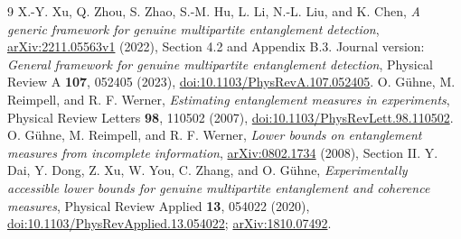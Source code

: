 \documentclass[11pt]{article}
\begin{document}
\begin{thebibliography}{9}
 X.-Y. Xu, Q. Zhou, S. Zhao, S.-M. Hu, L. Li, N.-L. Liu,
and K. Chen, \emph{A generic framework for genuine multipartite entanglement
detection}, \href{https://arxiv.org/abs/2211.05563v1}{arXiv:2211.05563v1}
(2022), Section 4.2 and Appendix B.3.
Journal version: \emph{General framework for genuine multipartite entanglement
detection}, Physical Review A \textbf{107}, 052405 (2023),
\href{https://doi.org/10.1103/PhysRevA.107.052405}{doi:10.1103/PhysRevA.107.052405}.
 O. G\"uhne, M. Reimpell, and R. F. Werner,
\emph{Estimating entanglement measures in experiments},
Physical Review Letters \textbf{98}, 110502 (2007),
\href{https://doi.org/10.1103/PhysRevLett.98.110502}{doi:10.1103/PhysRevLett.98.110502}.
 O. G\"uhne, M. Reimpell, and R. F. Werner,
\emph{Lower bounds on entanglement measures from incomplete information},
\href{https://arxiv.org/abs/0802.1734}{arXiv:0802.1734} (2008), Section II.
 Y. Dai, Y. Dong, Z. Xu, W. You, C. Zhang, and O. G\"uhne,
\emph{Experimentally accessible lower bounds for genuine multipartite
entanglement and coherence measures}, Physical Review Applied \textbf{13},
054022 (2020),
\href{https://doi.org/10.1103/PhysRevApplied.13.054022}{doi:10.1103/PhysRevApplied.13.054022};
\href{https://arxiv.org/abs/1810.07492}{arXiv:1810.07492}.
\end{thebibliography}
\end{document}
